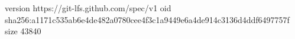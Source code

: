 version https://git-lfs.github.com/spec/v1
oid sha256:a1171c535ab6e4de482a0780cee4f3c1a9449e6a4de914c3136d4ddf6497757f
size 43840

